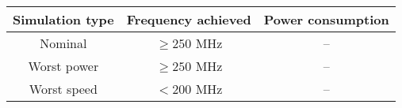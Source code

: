 \begin{tabular}{| c | c | c |}
	\hline
	Simulation type & Frequency achieved & Power consumption\\
	\hline
 	Nominal & $\ge 250$ MHz & -- \\
	\hline
 	Worst power & $\ge 250$ MHz & -- \\
	\hline 
	Worst speed & $< 200$ MHz & -- \\
	\hline 
	
\end{tabular}






